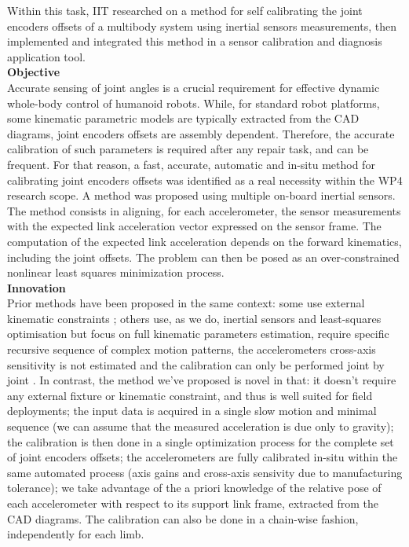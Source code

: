 
Within this task, IIT researched on a method for self calibrating the joint encoders offsets of a multibody system using inertial sensors measurements, then implemented and integrated this method in a sensor calibration and diagnosis application tool.\\

\textbf{Objective}\\

Accurate sensing of joint angles is a crucial requirement for effective dynamic whole-body control of humanoid robots. While, for standard robot platforms, some kinematic parametric models are typically extracted from the CAD diagrams, joint encoders offsets are assembly dependent. Therefore, the accurate calibration of such parameters is required after any repair task, and can be frequent. For that reason, a fast, accurate, automatic and in-situ method for calibrating joint encoders offsets was identified as a real necessity within the WP4 research scope. A method was proposed using multiple on-board inertial sensors. The method consists in aligning, for each accelerometer, the sensor measurements with the expected link acceleration vector expressed on the sensor frame. The computation of the expected link acceleration depends on the forward kinematics, including the joint offsets. The problem can then be posed as an over-constrained nonlinear least squares minimization process.\\

\textbf{Innovation}\\

Prior methods have been proposed in the same context: some use external kinematic constraints \cite{Hollerbach2008} \cite{Liu2009}; others use, as we do, inertial sensors and least-squares optimisation but focus on full kinematic parameters estimation, require specific recursive sequence of complex motion patterns, the accelerometers cross-axis sensitivity is not estimated and the calibration can only be performed joint by joint \cite{Wieser2011} \cite{Mittendorfer2012} \cite{Mittendorfer2014}. In contrast, the method we've proposed is novel in that: it doesn't require any external fixture or kinematic constraint, and thus is well suited for field deployments; the input data is acquired in a single slow motion and minimal sequence (we can assume that the measured acceleration is due only to gravity); the calibration is then done in a single optimization process for the complete set of joint encoders offsets; the accelerometers are fully calibrated in-situ within the same automated process (axis gains and cross-axis sensivity due to manufacturing tolerance); we take advantage of the a priori knowledge of the relative pose of each accelerometer with respect to its support link frame, extracted from the CAD diagrams. The calibration can also be done in a chain-wise fashion, independently for each limb.\\

